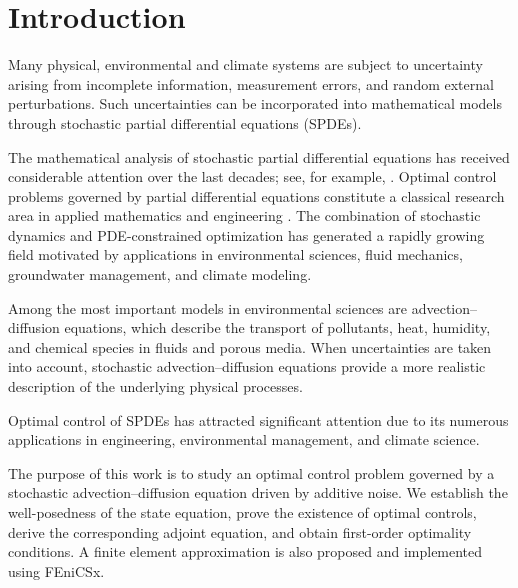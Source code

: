 \section{Introduction}


Many physical, environmental and climate systems are subject to uncertainty arising from incomplete 
information, measurement errors, and random external perturbations. Such uncertainties can be 
incorporated into mathematical models through stochastic partial differential equations (SPDEs).


The mathematical analysis of stochastic partial differential equations has received considerable 
attention over the last decades; see, for example, \cite{DaPrato2014,Flandoli1995,Lord2014}. Optimal 
control problems governed by partial differential equations constitute a classical research area in 
applied mathematics and engineering \cite{Lions1971,Hinze2009,Gunzburger2003}. The combination of 
stochastic dynamics and PDE-constrained optimization has generated a rapidly growing field motivated 
by applications in environmental sciences, fluid mechanics, groundwater management, and climate modeling.


Among the most important models in environmental sciences are advection--diffusion equations, which 
describe the transport of pollutants, heat, humidity, and chemical species in fluids and porous media. 
When uncertainties are taken into account, stochastic advection--diffusion equations provide a more 
realistic description of the underlying physical processes.

Optimal control of SPDEs has attracted significant attention due to its numerous applications in
engineering, environmental management, and climate science.

The purpose of this work is to study an optimal control problem governed by a stochastic 
advection--diffusion equation driven by additive noise. We establish the well-posedness of the state 
equation, prove the existence of optimal controls, derive the corresponding adjoint equation, and 
obtain first-order optimality conditions. A finite element approximation is also proposed and implemented 
using FEniCSx.

